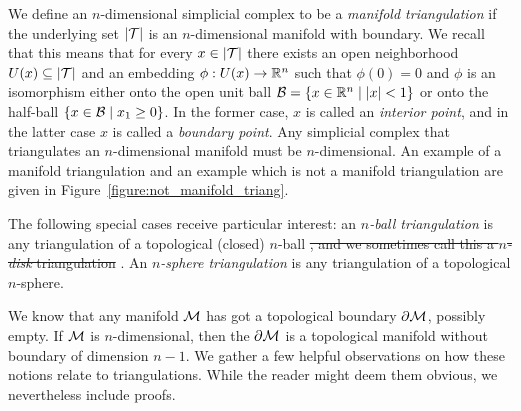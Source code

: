 \documentclass[10pt,letterpaper]{article}
\newcommand\cye[1]{%
  \protect\leavevmode
  \begingroup
    \color{red!35!yellow}%
    #1%
  \endgroup
}
\begin{document}
We define an $n$-dimensional simplicial complex to be a \emph{manifold triangulation} if the underlying set $\left| {\mathcal T} \right|$ is an $n$-dimensional manifold with boundary.
We recall that this means that for every $x \in \left| {\mathcal T} \right|$
there exists an open neighborhood $U(x) \subseteq \left| {\mathcal T} \right|$ and an embedding $\phi : U(x) \rightarrow {\mathbb R}^{n}$
such that $\phi(0) = 0$ and $\phi$ is an isomorphism either onto the open unit ball $\calB = \{ x \in \bbR^{n} \suchthat |x| < 1 \}$
or onto the half-ball $\{ x \in \calB \suchthat x_1 \geq 0 \}$.
In the former case, $x$ is called an \emph{interior point}, and in the latter case $x$ is called a \emph{boundary point}. 
Any simplicial complex that triangulates an $n$-dimensional manifold must be $n$-dimensional. 
\cye{An example of a manifold triangulation and an example which is not a manifold triangulation are given in Figure~\ref{figure:not_manifold_triang}.}

The following special cases receive particular interest:
an \textit{$n$-ball triangulation} is any triangulation of a topological (closed) $n$-ball\cye{\sout{,
and we sometimes call this a \textit{$n$-disk} triangulation}}.
An \textit{$n$-sphere triangulation} is any triangulation of a topological $n$-sphere. 


We know that any manifold ${\mathcal M}$ has got a topological boundary $\partial{\mathcal M}$, possibly empty. 
If ${\mathcal M}$ is $n$-dimensional, then the $\partial{\mathcal M}$ is a topological manifold without boundary of dimension $n-1$. 
We gather a few helpful observations on how these notions relate to triangulations.
While the reader might deem them obvious, we nevertheless include proofs. 
\end{document}
